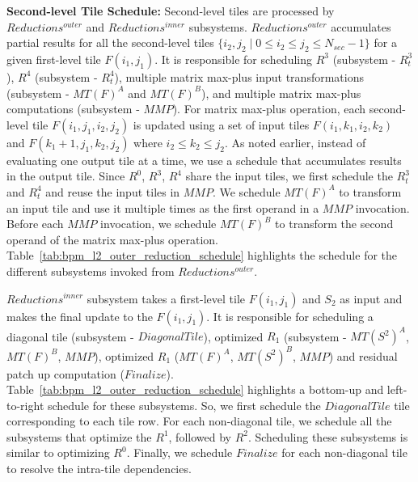 \textbf{Second-level Tile Schedule:} Second-level tiles are processed by $Reductions^{outer}$ and $Reductions^{inner}$ subsystems. $Reductions^{outer}$ accumulates partial results for all the second-level tiles $\{ i_{2}, j_{2} \mid 0 \le i_{2} \le j_{2} \le N_{sec}-1 \}$ for a given first-level tile $F(i_{1}, j_{1})$. It is responsible for scheduling $R^{3}$ (subsystem - $R^{3}_{t}$), $R^{4}$ (subsystem - $R^{4}_{t}$), multiple matrix max-plus input transformations (subsystem - $MT(F)^{A}$ and $MT(F)^{B}$), and multiple matrix max-plus computations (subsystem - $MMP$). For matrix max-plus operation, each second-level tile $F(i_{1}, j_{1}, i_{2}, j_{2})$ is updated using a set of input tiles $F(i_{1}, k_{1}, i_{2}, k_{2})$ and $F(k_{1}+1, j_{1}, k_{2}, j_{2})$ where $i_{2} \le k_{2} \le j_{2}$. As noted earlier, instead of evaluating one output tile at a time, we use a schedule that accumulates results in the output tile. Since $R^{0}$, $R^{3}$, $R^{4}$ share the input tiles, we first schedule the $R^{3}_{t}$ and $R^{4}_{t}$ and reuse the input tiles in $MMP$. We schedule $MT(F)^{A}$ to transform an input tile and use it multiple times as the first operand in a $MMP$ invocation. Before each $MMP$ invocation, we schedule $MT(F)^{B}$ to transform the second operand of the matrix max-plus operation. Table~\ref{tab:bpm_l2_outer_reduction_schedule} highlights the schedule for the different subsystems invoked from $Reductions^{outer}$.
 

$Reductions^{inner}$ subsystem takes a first-level tile $F(i_{1}, j_{1})$ and $S_{2}$ as input and makes the final update to the $F(i_{1}, j_{1})$. It is responsible for scheduling a diagonal tile (subsystem - $DiagonalTile$), optimized $R_{1}$ (subsystem - $MT(S^{2})^{A}$, $MT(F)^{B}$, $MMP$), optimized $R_{1}$ ($MT(F)^{A}$, $MT(S^{2})^{B}$, $MMP$) and residual patch up computation ($Finalize$). Table~\ref{tab:bpm_l2_outer_reduction_schedule} highlights a bottom-up and left-to-right schedule for these subsystems. So, we first schedule the $DiagonalTile$ tile corresponding to each tile row. For each non-diagonal tile, we schedule all the subsystems that optimize the $R^{1}$, followed by $R^{2}$. Scheduling these subsystems is similar to optimizing $R^{0}$. Finally, we schedule $Finalize$ for each non-diagonal tile to resolve the intra-tile dependencies.

